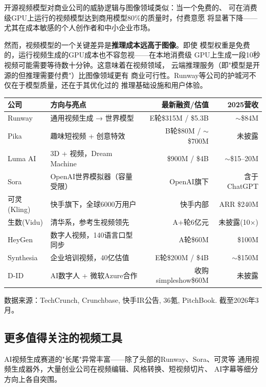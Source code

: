 开源视频模型对商业公司的威胁逻辑与图像领域类似：当一个免费的、
可在消费级GPU上运行的视频模型达到商用模型80\%的质量时，付费意愿
将显著下降——尤其在成本敏感的个人创作者和中小企业市场。

然而，视频模型的一个关键差异是\textbf{推理成本远高于图像}。即使
模型权重是免费的，运行视频生成的GPU成本也不容忽视——在本地消费级
GPU上生成一段10秒视频可能需要等待数十分钟。这意味着在视频领域，
云端推理服务（即"模型是开源的但推理需要付费"）比图像领域更有
商业可行性。Runway等公司的护城河不仅在于模型质量，还在于其优化过的
推理基础设施和用户体验。

\begin{keybox}
\small
\begin{tabularx}{\textwidth}{l X r r}
\toprule
\rowcolor{figLightGray}
\textbf{公司} & \textbf{方向与亮点} & \textbf{最新融资/估值} & \textbf{2025营收} \\
\midrule
Runway      & 通用视频生成 → 世界模型    & E轮\$315M / \$5.3B     & $\sim$\$84M \\
Pika        & 趣味短视频 + 创意特效      & B轮\$80M / $\sim$\$700M & 未披露 \\
Luma AI     & 3D + 视频，Dream Machine   & \$900M / \$4B           & $\sim$\$15--20M \\
Sora        & OpenAI世界模拟器（容量受限）& OpenAI旗下              & 含于ChatGPT \\
可灵(Kling)  & 快手旗下，全球6000万用户   & 快手内部                & ARR \$240M \\
生数(Vidu)   & 清华系，参考生视频领先     & A+轮6亿元               & 未披露(10$\times$) \\
HeyGen      & 数字人视频，140语言口型同步 & A轮\$60M                & \$100M \\
Synthesia   & 企业培训视频，40亿估值     & E轮\$200M / \$4B        & $\sim$\$150M \\
D-ID        & AI数字人 + 微软Azure合作   & 收购simpleshow\$60M     & 未披露 \\
\bottomrule
\end{tabularx}

\medskip
\noindent 数据来源：TechCrunch, Crunchbase, 快手IR公告, 36氪, PitchBook.
截至2026年3月。
\end{keybox}

\subsection{更多值得关注的视频工具}

AI视频生成赛道的"长尾"异常丰富——除了头部的Runway、Sora、可灵等
通用视频生成器外，大量创业公司在视频编辑、风格转换、短视频切片、
AI字幕等细分方向上各自突围。

